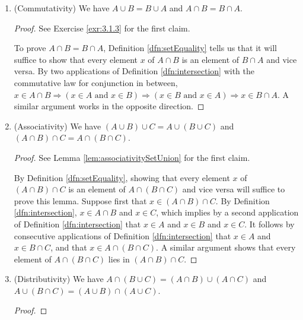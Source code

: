 \documentclass[../main.tex]{subfiles}
\begin{document}
\begin{enumerate}[ref={\thesection.\arabic*}]
\begin{prp}
\begin{enumerate}[label={\textup{(}\alph*\textup{)}}]
\begin{proof}
                See Exercise \ref{exr:3.1.3} for the second claim.
            \end{proof}
            \item (Commutativity) We have $A\cup B=B\cup A$ and $A\cap B=B\cap A$.
            \begin{proof}
                See Exercise \ref{exr:3.1.3} for the first claim.\par
                To prove $A\cap B=B\cap A$, Definition \ref{dfn:setEquality} tells us that it will suffice to show that every element $x$ of $A\cap B$ is an element of $B\cap A$ and vice versa. By two applications of Definition \ref{dfn:intersection} with the commutative law for conjunction in between, $x\in A\cap B \Longrightarrow (x\in A\text{ and }x\in B) \Longrightarrow (x\in B\text{ and }x\in A) \Longrightarrow x\in B\cap A$. A similar argument works in the opposite direction.
            \end{proof}
            \item (Associativity) We have $(A\cup B)\cup C=A\cup(B\cup C)$ and $(A\cap B)\cap C=A\cap(B\cap C)$.
            \begin{proof}
                See Lemma \ref{lem:associativitySetUnion} for the first claim.\par
                By Definition \ref{dfn:setEquality}, showing that every element $x$ of $(A\cap B)\cap C$ is an element of $A\cap(B\cap C)$ and vice versa will suffice to prove this lemma. Suppose first that $x\in (A\cap B)\cap C$. By Definition \ref{dfn:intersection}, $x\in A\cap B$ and $x\in C$, which implies by a second application of Definition \ref{dfn:intersection} that $x\in A$ and $x\in B$ and $x\in C$. It follows by consecutive applications of Definition \ref{dfn:intersection} that $x\in A$ and $x\in B\cap C$, and that $x\in A\cap(B\cap C)$. A similar argument shows that every element of $A\cap(B\cap C)$ lies in $(A\cap B)\cap C$.
            \end{proof}
            \item (Distributivity) We have $A\cap(B\cup C)=(A\cap B)\cup(A\cap C)$ and $A\cup(B\cap C)=(A\cup B)\cap(A\cup C)$.
            \begin{proof}

\end{proof}
\end{enumerate}
\end{prp}
\end{enumerate}
\end{document}
